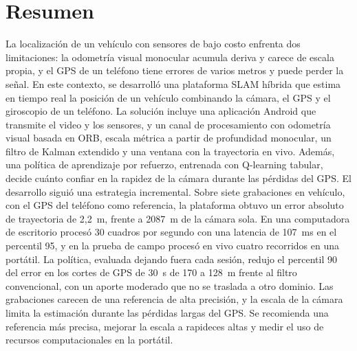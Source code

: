 
\chapter*{Resumen}
\thispagestyle{empty}

La localización de un vehículo con sensores de bajo costo enfrenta dos limitaciones: la odometría visual monocular acumula deriva y carece de escala propia, y el GPS de un teléfono tiene errores de varios metros y puede perder la señal.
En este contexto, se desarrolló una plataforma SLAM híbrida que estima en tiempo real la posición de un vehículo combinando la cámara, el GPS y el giroscopio de un teléfono.
La solución incluye una aplicación Android que transmite el video y los sensores, y un canal de procesamiento con odometría visual basada en ORB, escala métrica a partir de profundidad monocular, un filtro de Kalman extendido y una ventana con la trayectoria en vivo.
Además, una política de aprendizaje por refuerzo, entrenada con Q-learning tabular, decide cuánto confiar en la rapidez de la cámara durante las pérdidas del GPS.
El desarrollo siguió una estrategia incremental.
Sobre siete grabaciones en vehículo, con el GPS del teléfono como referencia, la plataforma obtuvo un error absoluto de trayectoria de 2,2~m, frente a 2087~m de la cámara sola.
En una computadora de escritorio procesó 30 cuadros por segundo con una latencia de 107~ms en el percentil 95, y en la prueba de campo procesó en vivo cuatro recorridos en una portátil.
La política, evaluada dejando fuera cada sesión, redujo el percentil 90 del error en los cortes de GPS de 30~s de 170 a 128~m frente al filtro convencional, con un aporte moderado que no se traslada a otro dominio.
Las grabaciones carecen de una referencia de alta precisión, y la escala de la cámara limita la estimación durante las pérdidas largas del GPS.
Se recomienda una referencia más precisa, mejorar la escala a rapideces altas y medir el uso de recursos computacionales en la portátil.
\bigskip

